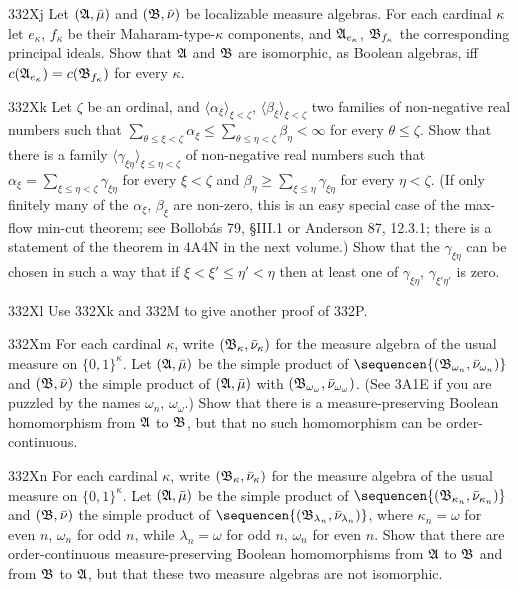 {\spheader 332Xj Let $(\frak A,\bar\mu)$ and $(\frak B,\bar\nu)$ be
localizable measure algebras.   For each cardinal $\kappa$ let
$e_{\kappa}$, $f_{\kappa}$ be their Maharam-type-$\kappa$ components,
and $\frak A_{e_{\kappa}}$, $\frak B_{f_{\kappa}}$ the corresponding
principal ideals.   Show that $\frak A$ and $\frak B$ are isomorphic, as
Boolean algebras, iff $c(\frak A_{e_{\kappa}})=c(\frak B_{f_{\kappa}})$
for every $\kappa$.

\spheader 332Xk Let $\zeta$ be an ordinal, and
$\langle\alpha_{\xi}\rangle_{\xi<\zeta}$,
$\langle\beta_{\xi}\rangle_{\xi<\zeta}$ two families of non-negative
real numbers such that $\sum_{\theta\le\xi<\zeta}\alpha_{\xi}
\le\sum_{\theta\le\eta<\zeta}\beta_{\eta}<\infty$ for every
$\theta\le\zeta$.   Show that there is a family
$\langle\gamma_{\xi\eta}\rangle_{\xi\le\eta<\zeta}$ of non-negative real
numbers such that
$\alpha_{\xi}=\sum_{\xi\le\eta<\zeta}\gamma_{\xi\eta}$ for every
$\xi<\zeta$ and
$\beta_{\eta}\ge\sum_{\xi\le\eta}\gamma_{\xi\eta}$ for every
$\eta<\zeta$.   (If only finitely many of the $\alpha_{\xi}$,
$\beta_{\xi}$ are non-zero, this is an easy special case of the max-flow
min-cut theorem;  see {\smc Bollob\'as 79}, {\S}III.1 or {\smc Anderson 87}, 12.3.1;
there is a statement of the theorem in 4A4N in the next volume.)
Show that the $\gamma_{\xi\eta}$ can be chosen in such a way that if
$\xi<\xi'\le\eta'<\eta$ then at least one of $\gamma_{\xi\eta}$,
$\gamma_{\xi'\eta'}$ is zero.

\spheader 332Xl Use 332Xk and 332M to give another proof of 332P.

\spheader 332Xm For each cardinal $\kappa$, write
$(\frak B_{\kappa},\bar\nu_{\kappa})$ for the measure algebra of the usual
measure on $\{0,1\}^{\kappa}$.   Let $(\frak A,\bar\mu)$ be the simple
product of $\sequencen{(\frak B_{\omega_n},\bar\nu_{\omega_n})}$ and
$(\frak B,\bar\nu)$ the simple product of $(\frak A,\bar\mu)$ with
$(\frak B_{\omega_{\omega}},\bar\nu_{\omega_{\omega}})$.   (See 3A1E if
you are puzzled by the names $\omega_n$, $\omega_{\omega}$.)   Show that there is a
measure-preserving Boolean homomorphism from $\frak A$ to $\frak B$, but
that no such homomorphism can be order-continuous.

\spheader 332Xn For each cardinal $\kappa$, write
$(\frak B_{\kappa},\bar\nu_{\kappa})$ for the measure algebra of the usual
measure on $\{0,1\}^{\kappa}$.  Let $(\frak A,\bar\mu)$ be the simple product of
$\sequencen{(\frak B_{\kappa_{n}},\bar\nu_{\kappa_{n}})}$ and
$(\frak B,\bar\nu)$ the simple product of
$\sequencen{(\frak B_{\lambda_{n}},\bar\nu_{\lambda_{n}})}$, where
$\kappa_n=\omega$ for
even $n$, $\omega_n$ for odd $n$, while $\lambda_n=\omega$ for odd $n$,
$\omega_n$ for even $n$.   Show that there are
order-continuous measure-preserving Boolean homomorphisms from $\frak A$
to $\frak B$ and from $\frak B$ to $\frak A$, but that these two measure
algebras are not isomorphic.

}
